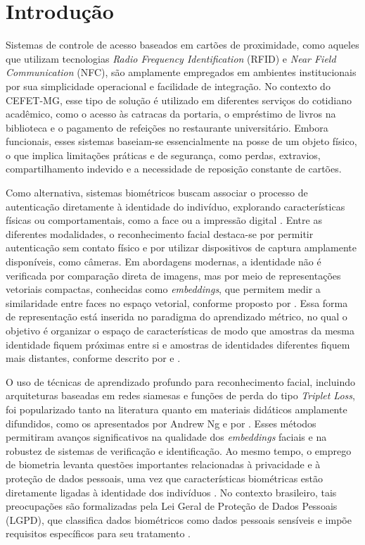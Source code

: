 \chapter{Introdução}

Sistemas de controle de acesso baseados em cartões de proximidade, como aqueles que utilizam tecnologias \textit{Radio Frequency Identification} (\acs{RFID}) e \textit{Near Field Communication} (\acs{NFC}), são amplamente empregados em ambientes institucionais por sua simplicidade operacional e facilidade de integração. No contexto do \acs{CEFET-MG}, esse tipo de solução é utilizado em diferentes serviços do cotidiano acadêmico, como o acesso às catracas da portaria, o empréstimo de livros na biblioteca e o pagamento de refeições no restaurante universitário. Embora funcionais, esses sistemas baseiam-se essencialmente na posse de um objeto físico, o que implica limitações práticas e de segurança, como perdas, extravios, compartilhamento indevido e a necessidade de reposição constante de cartões.

Como alternativa, sistemas biométricos buscam associar o processo de autenticação diretamente à identidade do indivíduo, explorando características físicas ou comportamentais, como a face ou a impressão digital \cite{jain2004biometric, bolle2013guide}. Entre as diferentes modalidades, o reconhecimento facial destaca-se por permitir autenticação sem contato físico e por utilizar dispositivos de captura amplamente disponíveis, como câmeras. Em abordagens modernas, a identidade não é verificada por comparação direta de imagens, mas por meio de representações vetoriais compactas, conhecidas como \textit{embeddings}, que permitem medir a similaridade entre faces no espaço vetorial, conforme proposto por \textcite{schroff2015facenet}. Essa forma de representação está inserida no paradigma do aprendizado métrico, no qual o objetivo é organizar o espaço de características de modo que amostras da mesma identidade fiquem próximas entre si e amostras de identidades diferentes fiquem mais distantes, conforme descrito por \textcite{bellet2015survey} e \textcite{ge2018hierarchical}.

O uso de técnicas de aprendizado profundo para reconhecimento facial, incluindo arquiteturas baseadas em redes siamesas e funções de perda do tipo \textit{Triplet Loss}, foi popularizado tanto na literatura quanto em materiais didáticos amplamente difundidos, como os apresentados por Andrew Ng \cite{ng2021deeplearning} e por \textcite{bromley1994siamese}. Esses métodos permitiram avanços significativos na qualidade dos \textit{embeddings} faciais e na robustez de sistemas de verificação e identificação. Ao mesmo tempo, o emprego de biometria levanta questões importantes relacionadas à privacidade e à proteção de dados pessoais, uma vez que características biométricas estão diretamente ligadas à identidade dos indivíduos \cite{north2020biometric}. No contexto brasileiro, tais preocupações são formalizadas pela Lei Geral de Proteção de Dados Pessoais (\acs{LGPD}), que classifica dados biométricos como dados pessoais sensíveis e impõe requisitos específicos para seu tratamento \cite{lgpd2018lei}.

